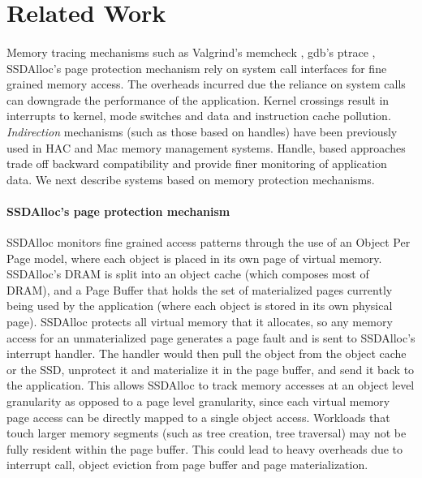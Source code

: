 \section{Related Work}
\label{sec:related}
\paragraph{}
Memory tracing mechanisms such as Valgrind's memcheck \cite{nethercote2007valgrind}, gdb's ptrace \cite{gdb}, SSDAlloc's \cite{SSDAlloc} page protection mechanism rely on system call interfaces for  fine grained memory access. The overheads incurred due the reliance on system calls can downgrade the performance of the application. Kernel crossings result in interrupts to kernel, mode switches and data and instruction cache pollution. {\emph{Indirection}} mechanisms (such as those based on handles) have been previously used in HAC \cite{castro1997hac} and Mac memory management systems. Handle, based approaches trade off backward compatibility and provide finer monitoring of application data. We next describe systems based on memory protection mechanisms.

\paragraph{SSDAlloc's page protection mechanism}
SSDAlloc monitors fine grained access patterns through the use of an Object Per Page model, where each object is placed in its own page of virtual memory. SSDAlloc's DRAM is split into an object cache (which composes most of DRAM), and a Page Buffer that holds the set of materialized pages currently being used by the application (where each object is stored in its own physical page). SSDAlloc protects all virtual memory that it allocates, so any memory access for an unmaterialized page generates a page fault and is sent to SSDAlloc's interrupt handler. The handler would then pull the object from the object cache or the SSD, unprotect it and materialize it in the page buffer, and send it back to the application. This allows SSDAlloc to track memory accesses at an object level granularity as opposed to a page level granularity, since each virtual memory page access can be directly mapped to a single object access. Workloads that touch larger memory segments (such as tree creation, tree traversal) may not be fully resident within the page buffer. This could lead to heavy overheads due to interrupt call, object eviction from page buffer and page materialization.

